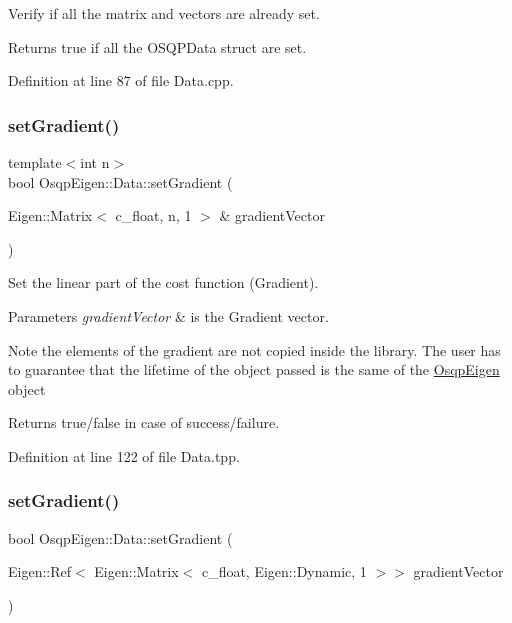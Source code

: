 Verify if all the matrix and vectors are already set. 

\begin{DoxyReturn}{Returns}
true if all the O\+S\+Q\+P\+Data struct are set. 
\end{DoxyReturn}


Definition at line 87 of file Data.\+cpp.

\mbox{\label{classOsqpEigen_1_1Data_a46b476556b8f71326c6827285f10b970}} 
\subsubsection{\texorpdfstring{set\+Gradient()}{setGradient()}\hspace{0.1cm}{\footnotesize\ttfamily [1/2]}}
{\footnotesize\ttfamily template$<$int n$>$ \\
bool Osqp\+Eigen\+::\+Data\+::set\+Gradient (\begin{DoxyParamCaption}\item[{Eigen\+::\+Matrix$<$ c\+\_\+float, n, 1 $>$ \&}]{gradient\+Vector }\end{DoxyParamCaption})}



Set the linear part of the cost function (Gradient). 


\begin{DoxyParams}{Parameters}
{\em gradient\+Vector} & is the Gradient vector. \\
\hline
\end{DoxyParams}
\begin{DoxyNote}{Note}
the elements of the gradient are not copied inside the library. The user has to guarantee that the lifetime of the object passed is the same of the \mbox{\hyperlink{namespaceOsqpEigen}{Osqp\+Eigen}} object 
\end{DoxyNote}
\begin{DoxyReturn}{Returns}
true/false in case of success/failure. 
\end{DoxyReturn}


Definition at line 122 of file Data.\+tpp.

\mbox{\label{classOsqpEigen_1_1Data_ab86ee5d803c64024e54c36f6788e0b60}} 
\subsubsection{\texorpdfstring{set\+Gradient()}{setGradient()}\hspace{0.1cm}{\footnotesize\ttfamily [2/2]}}
{\footnotesize\ttfamily bool Osqp\+Eigen\+::\+Data\+::set\+Gradient (\begin{DoxyParamCaption}\item[{Eigen\+::\+Ref$<$ Eigen\+::\+Matrix$<$ c\+\_\+float, Eigen\+::\+Dynamic, 1 $>$$>$}]{gradient\+Vector }\end{DoxyParamCaption})}



